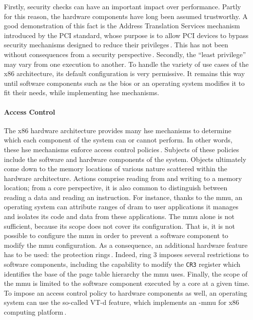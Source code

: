 Firstly, security checks can have an important impact over performance.
%
Partly for this reason, the hardware components have long been assumed
trustworthy.
%
A good demonstration of this fact is the Address Translation Services mechanism
introduced by the PCI standard, whose purpose is to allow PCI devices to bypass
security mechanisms designed to reduce their
privileges\,\cite{daubignard2017protip}.
%
This has not been without consequences from a security
perspective\,\cite{nohl2014badusb,hudson2015thunderstrike,chifflier2013uefi}.
%
Secondly, the ``least privilege'' may vary from one execution to another.
%
To handle the variety of use cases of the x86 architecture, its default
configuration is very permissive.
%
It remains this way until software components such as the \ac{bios} or an
operating system modifies it to fit their needs, while implementing \ac{hse}
mechanisms.


\paragraph{Access Control}
%
The x86 hardware architecture provides many \ac{hse} mechanisms to determine
which \IO each component of the system can or cannot perform.
%
In other words, these \ac{hse} mechanisms enforce access control
policies\,\cite{sandhu1994access}.
%
Subjects of these policies include the software and hardware components of the
system.
%
Objects ultimately come down to the memory locations of various nature scattered
within the hardware architecture.
%
Actions comprise reading from and writing to a memory location; from a core
perspective, it is also common to distinguish between reading a data and reading
an instruction.
%
For instance, thanks to the \ac{mmu}, an operating system can attribute ranges
of \ac{dram} to user applications it manages and isolates its code and data from
these applications.
%
The \ac{mmu} alone is not sufficient, because its scope does not cover its
configuration.
%
That is, it is not possible to configure the \ac{mmu} in order to prevent a
software component to modify the \ac{mmu} configuration.
%
As a consequence, an additional hardware feature has to be used: the protection
rings\,\cite[Volume 3, Section 5.5]{intel2014manual}.
%
Indeed, ring 3 imposes several restrictions to software components, including
the capability to modify the \texttt{CR3} register which identifies the base of
the page table hierarchy the \ac{mmu} uses.
%
Finally, the scope of the \ac{mmu} is limited to the software component executed
by a core at a given time.
%
To impose an access control policy to hardware components as well, an operating
system can use the so-called VT-d feature, which implements an \IO-\ac{mmu} for
x86 computing platform\,\cite{abramson2006vtd}.


